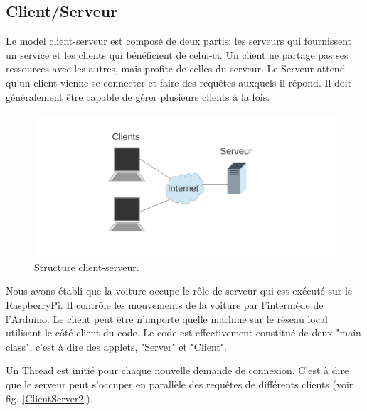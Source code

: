 \documentclass[a4paper,11pt]{report}
\begin{document}
{\subsection{Client/Serveur\label{ClientServeur}}
Le model client-serveur est composé de deux partis: les serveurs qui fournissent un service et les clients qui bénéficient de celui-ci. Un client ne partage pas ses ressources avec les autres, mais profite de celles du serveur. Le Serveur attend qu'un client vienne se connecter et faire des requêtes auxquels il répond. Il doit généralement être capable de gérer plusieurs clients à la fois.

\begin{figure}[h]
\includegraphics[width=1.0\textwidth]{figures/Client_Server1.pdf}
\caption[Structure client-serveur]{\label{ClientServer1}Structure client-serveur.}
\end{figure}

Nous avons établi que la voiture occupe le rôle de serveur qui est exécuté sur le RaspberryPi. Il contrôle les mouvements de la voiture par l'intermède de l'Arduino. Le client peut être n'importe quelle machine sur le réseau local utilisant le côté client du code. Le code est effectivement constitué de deux "main class", c'est à dire des applets, "Server" et "Client". 

Un Thread est initié pour chaque nouvelle demande de connexion. C'est à dire que le serveur peut s'occuper en parallèle des requêtes de différents clients (voir fig. \ref{ClientServer2}). 

}
\end{document}
